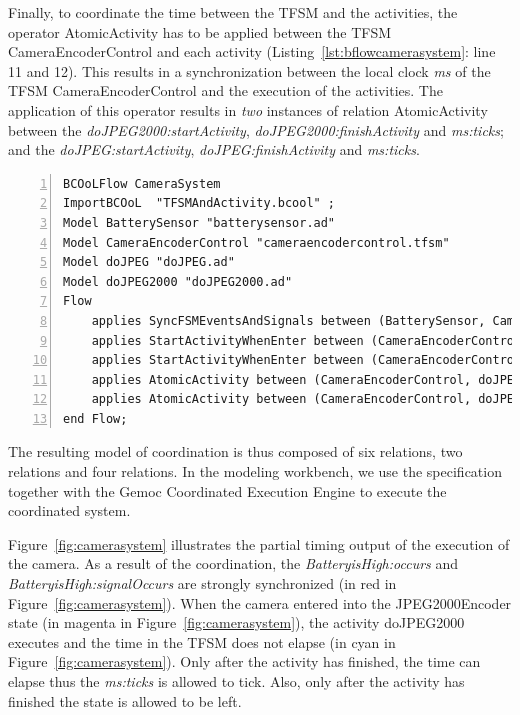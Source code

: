 Finally, to coordinate the time between the TFSM and the activities, the operator AtomicActivity has to be applied between the TFSM CameraEncoderControl and each activity (Listing~\ref{lst:bflowcamerasystem}: line 11 and 12). This results in a synchronization between the local clock \emph{ms} of the TFSM CameraEncoderControl and the execution of the activities. The application of this operator results in \emph{two} instances of \moccml relation AtomicActivity between the \mse \emph{doJPEG2000:startActivity}, \emph{doJPEG2000:finishActivity} and \emph{ms:ticks}; and the \mse \emph{doJPEG:startActivity}, \emph{doJPEG:finishActivity} and \emph{ms:ticks}.


\begin{lstlisting}[language=bflow,
caption={\bflow specification for the Surveillance Camera System},
label={lst:bflowcamerasystem}, 
basicstyle=\scriptsize\ttfamily, backgroundcolor=\color{LGrey}, numbers=left, xleftmargin=2pt]
BCOoLFlow CameraSystem
ImportBCOoL  "TFSMAndActivity.bcool" ;
Model BatterySensor "batterysensor.ad"
Model CameraEncoderControl "cameraencodercontrol.tfsm"
Model doJPEG "doJPEG.ad"
Model doJPEG2000 "doJPEG2000.ad"
Flow 
	applies SyncFSMEventsAndSignals between (BatterySensor, CameraEncoderControl);
	applies StartActivityWhenEnter between (CameraEncoderControl, doJPEG);
	applies StartActivityWhenEnter between (CameraEncoderControl, doJPEG2000);
	applies AtomicActivity between (CameraEncoderControl, doJPEG);		
	applies AtomicActivity between (CameraEncoderControl, doJPEG2000);		
end Flow;
\end{lstlisting}

The resulting model of coordination is thus composed of six relations, \ie two \ccsl relations and four \moccml relations. In the modeling workbench, we use the \bflow specification together with the Gemoc Coordinated Execution Engine to execute the coordinated system.  




Figure~\ref{fig:camerasystem} illustrates the partial timing output of the execution of the camera. As a result of the coordination, the \mse \emph{BatteryisHigh:occurs} and \emph{BatteryisHigh:signalOccurs} are strongly synchronized (in red in Figure~\ref{fig:camerasystem}). When the camera entered into the JPEG2000Encoder state (in magenta in Figure~\ref{fig:camerasystem}), the activity doJPEG2000 executes and the time in the TFSM does not elapse (in cyan in Figure~\ref{fig:camerasystem}). Only after the activity has finished, the time can elapse thus the \mse \emph{ms:ticks} is allowed to tick. Also, only after the activity has finished the state is allowed to be left.
	
